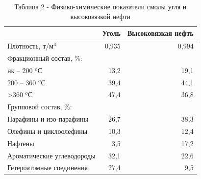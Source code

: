 \begin{table}[H]
\caption*{Таблица 2 - Физико-химические показатели смолы угля и
высоковязкой нефти}
\centering
\begin{tabular}{|l|r|r|}
\hline
                           & \multicolumn{1}{l|}{Уголь} & \multicolumn{1}{l|}{Высоковязкая нефть} \\ \hline
Плотность, т/м$^3$            & 0,935                      & 0,994                                   \\ \hline
Фракционный состав, \%:    & \multicolumn{1}{l|}{}      & \multicolumn{1}{l|}{}                   \\ \hline
нк – 200 $^o$С                & 13,2                       & 19,1                                    \\ \hline
200 – 360 $^o$С               & 39,4                       & 44,1                                    \\ \hline
\textgreater{}360 $^o$С       & 47,4                       & 36,8                                    \\ \hline
Групповой состав, \%:      & \multicolumn{1}{l|}{}      & \multicolumn{1}{l|}{}                   \\ \hline
Парафины и изо-парафины    & 26,7                       & 38,3                                    \\ \hline
Олефины и циклоолефины     & 10,3                       & 12,4                                    \\ \hline
Нафтены                    & 3,5                        & 17,2                                    \\ \hline
Ароматические углеводороды & 32,1                       & 22,6                                    \\ \hline
Гетероатомные соединения   & 27,4                       & 9,5                                     \\ \hline
\end{tabular}
\end{table}

